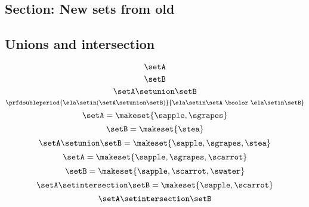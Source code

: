 \begin{forslides}
 \subsection{Section: New sets from old}   
 
 \subsection{Unions and intersection}
 
%
 \begin{equation}\label{slides_session2_1}
\setA
\end{equation}
\begin{equation}\label{slides_session2_2}
\setB
\end{equation}
 \begin{equation}\label{slides_session2_3}
\setA \setunion \setB
\end{equation}
\begin{equation}\label{slides_session2_4}
\prfdoubleperiod
    {\ela \setin(\setA \setunion \setB)}{\ela \setin\setA \ \boolor\  \ela \setin\setB}
\end{equation}
 \begin{equation}\label{slides_session2_5}
\setA = \makeset{ \sapple, \sgrapes }
\end{equation}
\begin{equation}\label{slides_session2_6}
\setB = \makeset{ \stea }
\end{equation}
 \begin{equation}\label{slides_session2_7}
\setA \setunion \setB = \makeset{ \sapple, \sgrapes, \stea }
\end{equation}
\begin{equation}\label{slides_session2_8}
\setA = \makeset{ \sapple, \sgrapes, \scarrot }
\end{equation}
 \begin{equation}\label{slides_session2_9}
\setB = \makeset{ \sapple, \scarrot, \swater }
\end{equation}
 \begin{equation}\label{slides_session2_10}
\setA \setintersection \setB = \makeset{ \sapple, \scarrot }
\end{equation}
 \begin{equation}\label{slides_session2_11}
\setA \setintersection \setB
\end{equation}
\begin{equation}\label{slides_session2_12}

\end{equation}
\end{forslides}
